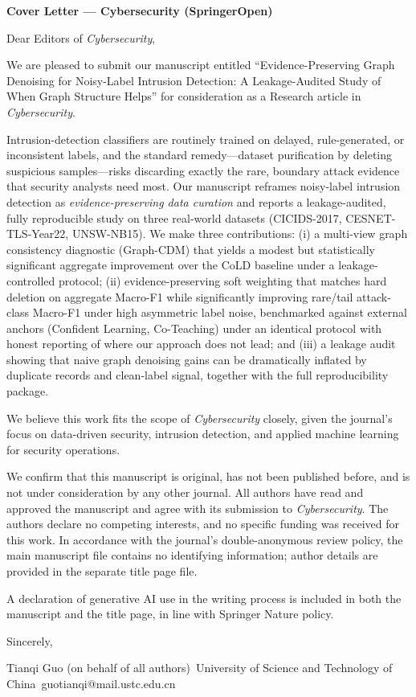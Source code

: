 \documentclass[11pt]{article}
\title{}
\begin{document}
\begin{center}\large\bfseries Cover Letter --- Cybersecurity (SpringerOpen)\end{center}
\vspace{1em}
Dear Editors of \textit{Cybersecurity},

We are pleased to submit our manuscript entitled ``Evidence-Preserving Graph Denoising for Noisy-Label Intrusion Detection: A Leakage-Audited Study of When Graph Structure Helps'' for consideration as a Research article in \textit{Cybersecurity}.

Intrusion-detection classifiers are routinely trained on delayed, rule-generated, or inconsistent labels, and the standard remedy---dataset purification by deleting suspicious samples---risks discarding exactly the rare, boundary attack evidence that security analysts need most. Our manuscript reframes noisy-label intrusion detection as \emph{evidence-preserving data curation} and reports a leakage-audited, fully reproducible study on three real-world datasets (CICIDS-2017, CESNET-TLS-Year22, UNSW-NB15). We make three contributions: (i) a multi-view graph consistency diagnostic (Graph-CDM) that yields a modest but statistically significant aggregate improvement over the CoLD baseline under a leakage-controlled protocol; (ii) evidence-preserving soft weighting that matches hard deletion on aggregate Macro-F1 while significantly improving rare/tail attack-class Macro-F1 under high asymmetric label noise, benchmarked against external anchors (Confident Learning, Co-Teaching) under an identical protocol with honest reporting of where our approach does not lead; and (iii) a leakage audit showing that naive graph denoising gains can be dramatically inflated by duplicate records and clean-label signal, together with the full reproducibility package.

We believe this work fits the scope of \textit{Cybersecurity} closely, given the journal's focus on data-driven security, intrusion detection, and applied machine learning for security operations.

We confirm that this manuscript is original, has not been published before, and is not under consideration by any other journal. All authors have read and approved the manuscript and agree with its submission to \textit{Cybersecurity}. The authors declare no competing interests, and no specific funding was received for this work. In accordance with the journal's double-anonymous review policy, the main manuscript file contains no identifying information; author details are provided in the separate title page file.

A declaration of generative AI use in the writing process is included in both the manuscript and the title page, in line with Springer Nature policy.

\vspace{1.5em}
Sincerely,

Tianqi Guo (on behalf of all authors)\
University of Science and Technology of China\
guotianqi@mail.ustc.edu.cn
\end{document}
